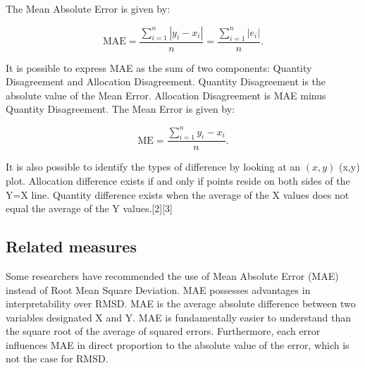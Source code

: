\documentclass[]{report}
\begin{document}
The Mean Absolute Error is given by:

\[{\displaystyle \mathrm {MAE} ={\frac {\sum _{i=1}^{n}\left|y_{i}-x_{i}\right|}{n}}={\frac {\sum _{i=1}^{n}\left|e_{i}\right|}{n}}.}\]

It is possible to express MAE as the sum of two components: Quantity Disagreement and Allocation Disagreement. Quantity Disagreement is the absolute value of the Mean Error. Allocation Disagreement is MAE minus Quantity Disagreement. The Mean Error is given by:

\[{\displaystyle \mathrm {ME} ={\frac {\sum _{i=1}^{n}y_{i}-x_{i}}{n}}.} \]

It is also possible to identify the types of difference by looking at an ${\displaystyle (x,y)}$ (x,y) plot. Allocation difference exists if and only if points reside on both sides of the Y=X line. Quantity difference exists when the average of the X values does not equal the average of the Y values.[2][3]
\subsection*{Related measures}
Some researchers have recommended the use of Mean Absolute Error (MAE) instead of Root Mean Square Deviation. MAE possesses advantages in interpretability over RMSD. MAE is the average absolute difference between two variables designated X and Y. MAE is fundamentally easier to understand than the square root of the average of squared errors. Furthermore, each error influences MAE in direct proportion to the absolute value of the error, which is not the case for RMSD.
\end{document}
